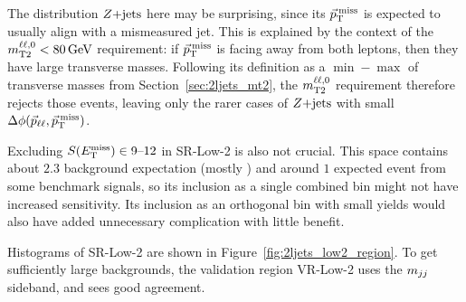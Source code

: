 The distribution $\zjets$ here may be surprising, since its $\ptmiss$ is
expected to usually align with a mismeasured jet.
This is explained by the context of the $\mttwoll < 80\,\eV[G]$
requirement:
if $\ptmiss$ is facing away from both leptons, then they have large transverse
masses.
Following its definition as a $\min-\max$ of transverse masses from
Section~\ref{sec:2ljets_mt2},
the $\mttwoll$ requirement therefore rejects those events, leaving only the
rarer cases of $\zjets$ with small $\dphillmet$.

Excluding $\metsig \in 9\textrm{--}12$ in SR-Low-2 is also not crucial.
This space contains about $2.3$ background expectation (mostly \diboson) and
around $1$ expected event from some benchmark signals, so its inclusion as a
single combined bin might not have increased sensitivity.
Its inclusion as an orthogonal bin with small yields would also have added
unnecessary complication with little benefit.

Histograms of SR-Low-2 are shown in Figure~\ref{fig:2ljets_low2_region}.
To get sufficiently large backgrounds, the validation region VR-Low-2 uses
the $\mjj$ sideband, and sees good agreement.

